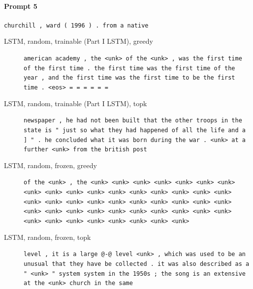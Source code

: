 \paragraph{Prompt 5} \texttt{churchill , ward ( 1996 ) . from a native}
\begin{description}
\item[LSTM, random, trainable (Part I LSTM), greedy] \texttt{\small american academy , the \textless{}unk\textgreater{} of the \textless{}unk\textgreater{} , was the first time of the first time . the first time was the first time of the year , and the first time was the first time to be the first time . \textless{}eos\textgreater{} = = = = = =}
\item[LSTM, random, trainable (Part I LSTM), topk] \texttt{\small newspaper , he had not been built that the other troops in the state is " just so what they had happened of all the life and a ] " . he concluded what it was born during the war . \textless{}unk\textgreater{} at a further \textless{}unk\textgreater{} from the british post}
\item[LSTM, random, frozen, greedy] \texttt{\small of the \textless{}unk\textgreater{} , the \textless{}unk\textgreater{} \textless{}unk\textgreater{} \textless{}unk\textgreater{} \textless{}unk\textgreater{} \textless{}unk\textgreater{} \textless{}unk\textgreater{} \textless{}unk\textgreater{} \textless{}unk\textgreater{} \textless{}unk\textgreater{} \textless{}unk\textgreater{} \textless{}unk\textgreater{} \textless{}unk\textgreater{} \textless{}unk\textgreater{} \textless{}unk\textgreater{} \textless{}unk\textgreater{} \textless{}unk\textgreater{} \textless{}unk\textgreater{} \textless{}unk\textgreater{} \textless{}unk\textgreater{} \textless{}unk\textgreater{} \textless{}unk\textgreater{} \textless{}unk\textgreater{} \textless{}unk\textgreater{} \textless{}unk\textgreater{} \textless{}unk\textgreater{} \textless{}unk\textgreater{} \textless{}unk\textgreater{} \textless{}unk\textgreater{} \textless{}unk\textgreater{} \textless{}unk\textgreater{} \textless{}unk\textgreater{} \textless{}unk\textgreater{} \textless{}unk\textgreater{} \textless{}unk\textgreater{} \textless{}unk\textgreater{} \textless{}unk\textgreater{} \textless{}unk\textgreater{} \textless{}unk\textgreater{} \textless{}unk\textgreater{} \textless{}unk\textgreater{} \textless{}unk\textgreater{} \textless{}unk\textgreater{} \textless{}unk\textgreater{} \textless{}unk\textgreater{} \textless{}unk\textgreater{}}
\item[LSTM, random, frozen, topk] \texttt{\small level , it is a large @-@ level \textless{}unk\textgreater{} , which was used to be an unusual that they have be collected . it was also described as a " \textless{}unk\textgreater{} " system system in the 1950s ; the song is an extensive at the \textless{}unk\textgreater{} church in the same}

\end{description}
